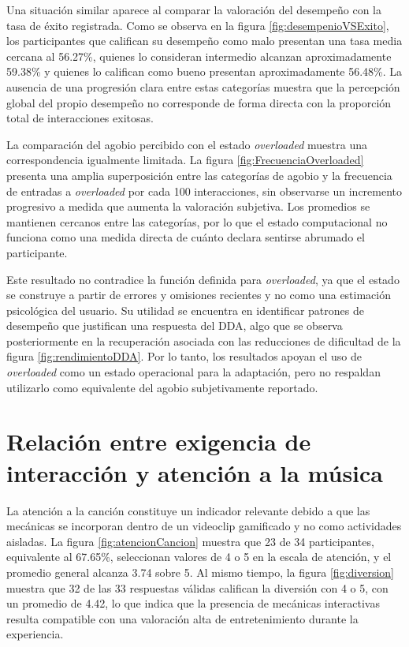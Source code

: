 Una situación similar aparece al comparar la valoración del desempeño 
con la tasa de éxito registrada. Como se observa en la figura
\ref{fig:desempenioVSExito}, los participantes que califican su 
desempeño como malo presentan una tasa media cercana al 56.27\%, 
quienes lo consideran intermedio alcanzan aproximadamente 59.38\% y 
quienes lo califican como bueno presentan aproximadamente 56.48\%. La 
ausencia de una progresión clara entre estas categorías muestra que 
la percepción global del propio desempeño no corresponde de forma 
directa con la proporción total de interacciones exitosas.

La comparación del agobio percibido con el estado \textit{overloaded} 
muestra una correspondencia igualmente limitada. La figura \ref{fig:FrecuenciaOverloaded}
presenta una amplia superposición entre las categorías de agobio y la 
frecuencia de entradas a \textit{overloaded} por cada 100 interacciones, 
sin observarse un incremento progresivo a medida que aumenta la 
valoración subjetiva. Los promedios se mantienen cercanos entre las 
categorías, por lo que el estado computacional no funciona como una 
medida directa de cuánto declara sentirse abrumado el participante.

Este resultado no contradice la función definida para \textit{overloaded}, 
ya que el estado se construye a partir de errores y omisiones recientes y 
no como una estimación psicológica del usuario. Su utilidad se encuentra 
en identificar patrones de desempeño que justifican una respuesta del DDA, 
algo que se observa posteriormente en la recuperación asociada con las 
reducciones de dificultad de la figura \ref{fig:rendimientoDDA}. Por lo
tanto, los resultados apoyan el uso de \textit{overloaded} como un 
estado operacional para la adaptación, pero no respaldan utilizarlo como 
equivalente del agobio subjetivamente reportado.

\section{Relación entre exigencia de interacción y atención a la música}
La atención a la canción constituye un indicador relevante debido a que 
las mecánicas se incorporan dentro de un videoclip gamificado y no como 
actividades aisladas. La figura \ref{fig:atencionCancion} muestra que 23
de 34 participantes, equivalente al 67.65\%, seleccionan valores de 4 o 5
en la escala de atención, y el promedio general alcanza 3.74 sobre 5. Al
mismo tiempo, la figura \ref{fig:diversion} muestra que 32 de las 33 
respuestas válidas califican la diversión con 4 o 5, con un promedio de 
4.42, lo que indica que la presencia de mecánicas interactivas resulta 
compatible con una valoración alta de entretenimiento durante la 
experiencia.

